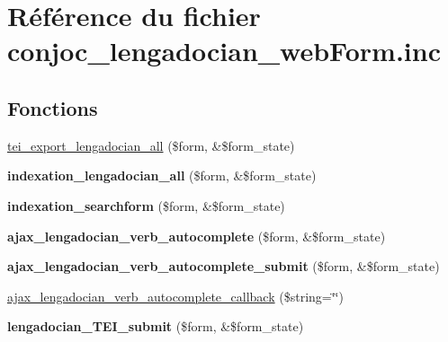 \hypertarget{conjoc__lengadocian__webForm_8inc}{}\section{Référence du fichier conjoc\+\_\+lengadocian\+\_\+web\+Form.\+inc}
\label{conjoc__lengadocian__webForm_8inc}
\subsection*{Fonctions}
\begin{DoxyCompactItemize}
\item 
\hyperlink{conjoc__lengadocian__webForm_8inc_a9c7725a828c1a44761bc51fe7a346215}{tei\+\_\+export\+\_\+lengadocian\+\_\+all} (\$form, \&\$form\+\_\+state)
\item 
\hypertarget{conjoc__lengadocian__webForm_8inc_a465cce16b0d09f364ccb546c46c82306}{}\label{conjoc__lengadocian__webForm_8inc_a465cce16b0d09f364ccb546c46c82306} 
{\bfseries indexation\+\_\+lengadocian\+\_\+all} (\$form, \&\$form\+\_\+state)
\item 
\hypertarget{conjoc__lengadocian__webForm_8inc_a3f7b0b4a8f4301190850532d5488c54a}{}\label{conjoc__lengadocian__webForm_8inc_a3f7b0b4a8f4301190850532d5488c54a} 
{\bfseries indexation\+\_\+searchform} (\$form, \&\$form\+\_\+state)
\item 
\hypertarget{conjoc__lengadocian__webForm_8inc_a95265729a90a0b79d7d98483fce78880}{}\label{conjoc__lengadocian__webForm_8inc_a95265729a90a0b79d7d98483fce78880} 
{\bfseries ajax\+\_\+lengadocian\+\_\+verb\+\_\+autocomplete} (\$form, \&\$form\+\_\+state)
\item 
\hypertarget{conjoc__lengadocian__webForm_8inc_a2206d720f533b7b1afa6ac0568e740ef}{}\label{conjoc__lengadocian__webForm_8inc_a2206d720f533b7b1afa6ac0568e740ef} 
{\bfseries ajax\+\_\+lengadocian\+\_\+verb\+\_\+autocomplete\+\_\+submit} (\$form, \&\$form\+\_\+state)
\item 
\hyperlink{conjoc__lengadocian__webForm_8inc_a26cea88ddc504d14492fa9fd58a060b4}{ajax\+\_\+lengadocian\+\_\+verb\+\_\+autocomplete\+\_\+callback} (\$string=\char`\"{}\char`\"{})
\item 
\hypertarget{conjoc__lengadocian__webForm_8inc_a704a4de756f6a38064970e97d4a2bc6c}{}\label{conjoc__lengadocian__webForm_8inc_a704a4de756f6a38064970e97d4a2bc6c} 
{\bfseries lengadocian\+\_\+\+T\+E\+I\+\_\+submit} (\$form, \&\$form\+\_\+state)
\item 

\end{DoxyCompactItemize}
